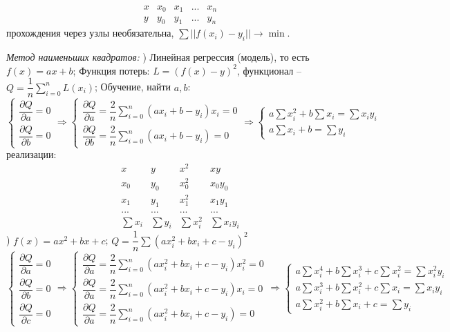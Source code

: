\documentclass[9pt]{article}
\begin{document}
\[\begin{array}{c|c|c|c|c}
    x & x_0 & x_1 & ... & x_n\\
    \hline
    y & y_0 & y_1 & ... & y_n
\end{array}\]
 прохождения через узлы необязательна, \(\sum||f(x_i)-y_i||\to\min\).
\par\textit{Метод наименьших квадратов:}
) Линейная регрессия (модель), то есть \(f(x) = ax + b\); Функция потерь: \(L=(f(x)-y)^2\), функционал -- \(Q=\dfrac{1}{n}\displaystyle\sum_{i=0}^nL(x_i)\); Обучение, найти \(a, b\):
\[\left\{\begin{array}{l}
    \dfrac{\partial Q}{\partial a}=0\\
    \dfrac{\partial Q}{\partial b}=0
\end{array}\right.\Rightarrow
\left\{\begin{array}{l}
    \dfrac{\partial Q}{\partial a}=\dfrac{2}{n}\displaystyle\sum_{i=0}^n(ax_i+b-y_i)x_i=0\\
    \dfrac{\partial Q}{\partial b}=\dfrac{2}{n}\displaystyle\sum_{i=0}^n(ax_i+b-y_i)=0
\end{array}\right.\Rightarrow\left\{\begin{array}{l}
    a\sum x_i^2+b\sum x_i=\sum x_iy_i \\
    a\sum x_i+b=\sum y_i
\end{array}\right.\]
 реализации:
\[\begin{array}{c|c|c|c}
    x & y & x^2 & xy\\
    \hline
    x_0 & y_0 & x_0^2 & x_0y_0 \\
    x_1 & y_1 & x_1^2 & x_1y_1 \\
    ... & ... & ... & ... \\
    \hline
    \sum x_i & \sum y_i & \sum x_i^2 & \sum x_iy_i
\end{array}\]
) \(f(x)=ax^2+bx+c\); \(Q=\dfrac{1}{n}\sum(ax_i^2+bx_i+c-y_i)^2\)
\[\left\{\begin{array}{l}
    \dfrac{\partial Q}{\partial a}=0\\
    \dfrac{\partial Q}{\partial b}=0\\
    \dfrac{\partial Q}{\partial c}=0
\end{array}\right.\Rightarrow
\left\{\begin{array}{l}
    \dfrac{\partial Q}{\partial a}=\dfrac{2}{n}\displaystyle\sum_{i=0}^n(ax_i^2+bx_i+c-y_i)x_i^2=0\\
    \dfrac{\partial Q}{\partial a}=\dfrac{2}{n}\displaystyle\sum_{i=0}^n(ax_i^2+bx_i+c-y_i)x_i=0\\
    \dfrac{\partial Q}{\partial a}=\dfrac{2}{n}\displaystyle\sum_{i=0}^n(ax_i^2+bx_i+c-y_i)=0
\end{array}\right.\Rightarrow\left\{\begin{array}{l}
    a\sum x_i^4+b\sum x_i^3+c\sum x_i^2=\sum x_i^2y_i \\
    a\sum x_i^3+b\sum x_i^2+c\sum x_i=\sum x_iy_i \\
    a\sum x_i^2+b\sum x_i+c=\sum y_i
\end{array}\right.\]
\end{document}
